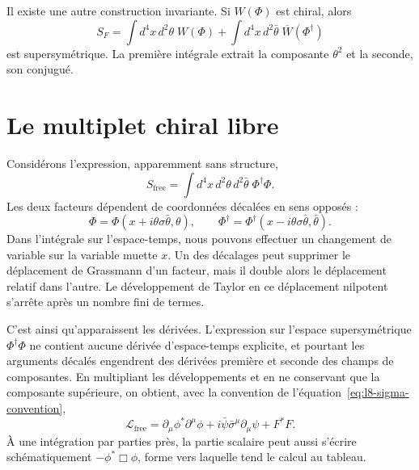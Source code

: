 Il existe une autre construction invariante. Si \(W(\Phi)\) est chiral, alors
\begin{equation}
S_F=\int d^4x\,d^2\theta\;W(\Phi)
+\int d^4x\,d^2\bar\theta\;\overline{W}(\Phi^\dagger)
\label{eq:l8-F-term-action}
\end{equation}
est supersymétrique. La première intégrale extrait la composante \(\theta^2\) et la seconde, son conjugué.

\begin{classroomqa}
\end{classroomqa}

\section{Le multiplet chiral libre}

Considérons l’expression, apparemment sans structure,
\begin{equation}
S_{\mathrm{free}}
=\int d^4x\,d^2\theta\,d^2\bar\theta\;
\Phi^\dagger\Phi.
\label{eq:l8-free-superaction}
\end{equation}
Les deux facteurs dépendent de coordonnées décalées en sens opposés :
\begin{equation}
\Phi=\Phi(x+i\theta\sigma\bar\theta,\theta),
\qquad
\Phi^\dagger
=\Phi^\dagger(x-i\theta\sigma\bar\theta,\bar\theta).
\end{equation}
Dans l’intégrale sur l’espace-temps, nous pouvons effectuer un changement de variable sur la variable muette \(x\). Un des décalages peut supprimer le déplacement de Grassmann d’un facteur, mais il double alors le déplacement relatif dans l’autre. Le développement de Taylor en ce déplacement nilpotent s’arrête après un nombre fini de termes.

C’est ainsi qu’apparaissent les dérivées. L’expression sur l’espace supersymétrique
\(\Phi^\dagger\Phi\) ne contient aucune dérivée d’espace-temps explicite, et pourtant les arguments décalés engendrent des dérivées première et seconde des champs de composantes. En multipliant les développements et en ne conservant que la composante supérieure, on obtient, avec la convention de l’équation~\eqref{eq:l8-sigma-convention},
\begin{equation}
\mathcal L_{\mathrm{free}}
=\partial_\mu\phi^\ast\partial^\mu\phi
+i\bar\psi\bar\sigma^\mu\partial_\mu\psi
+F^\ast F.
\label{eq:l8-free-component-lagrangian}
\end{equation}
À une intégration par parties près, la partie scalaire peut aussi s’écrire schématiquement \(-\phi^\ast\Box\phi\), forme vers laquelle tend le calcul au tableau.

